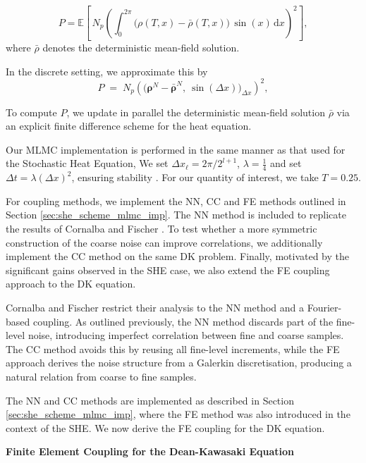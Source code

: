 \begin{equation}\label{eq:dk_qoi}
P = \mathbb{E}\!\left[\,N_p \left(\int_0^{2\pi} 
\big(\rho(T,x)-\bar{\rho}(T,x)\big)\,\sin(x)\,\mathrm{d}x\right)^{\!2}\right],
\end{equation}
where $\bar\rho$ denotes the deterministic mean-field solution.

In the discrete setting, we approximate this by
\begin{equation}
P \;=\; N_p \left( \big(\boldsymbol{\rho}^N - \boldsymbol{\bar\rho}^N,\ 
\sin(\Delta x)\big)_{\Delta x} \right)^{\!2},
\end{equation}

To compute $P$, we update in parallel the 
deterministic mean-field 
solution $\bar\rho$ via an explicit finite difference scheme for the 
heat equation.

Our MLMC implementation is performed in the same manner as that 
used for the Stochastic Heat Equation,
We set $\Delta x_\ell = 2 \pi / 2^{l + 1}$, $\lambda = \frac{1}{4}$
and set $\Delta t = \lambda (\Delta x)^2$, ensuring stability 
\cite{cornalba2025multilevel}.
For our quantity of interest, we take $T=0.25$.

For coupling methods, we implement the NN, CC and FE methods outlined in 
Section \ref{sec:she_scheme_mlmc_imp}. The NN method is included to replicate 
the results of Cornalba and Fischer \cite{cornalba2025multilevel}. To test whether 
a more symmetric construction of the coarse noise can improve correlations, 
we additionally implement the CC method on the same DK problem. Finally, 
motivated by the significant gains observed in the SHE case, we also extend the 
FE coupling approach to the DK equation.

Cornalba and Fischer restrict their analysis to the NN method and a Fourier-based 
coupling. As outlined previously, the NN method discards part of the fine-level noise, 
introducing imperfect correlation between fine and coarse samples. The CC method 
avoids this by reusing all fine-level increments, while the FE approach derives the 
noise structure from a Galerkin discretisation, producing a natural relation 
from coarse to fine samples.

The NN and CC methods are implemented as described in 
Section \ref{sec:she_scheme_mlmc_imp}, where the FE method was also introduced 
in the context of the SHE. We now derive the FE coupling for the DK equation.
\newline

\textbf{Finite Element Coupling for the Dean-Kawasaki Equation}

